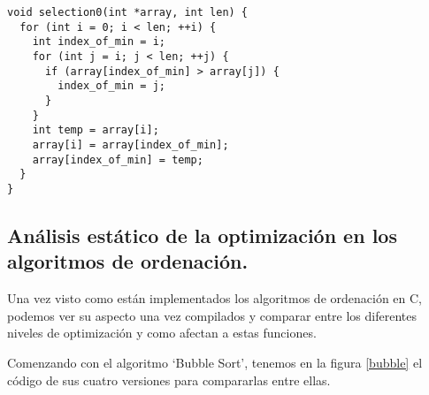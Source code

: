 \begin{lstlisting}[caption=Implementación de Selection Sort]
void selection0(int *array, int len) {
  for (int i = 0; i < len; ++i) {
    int index_of_min = i;
    for (int j = i; j < len; ++j) {
      if (array[index_of_min] > array[j]) {
        index_of_min = j;
      }
    }
    int temp = array[i];
    array[i] = array[index_of_min];
    array[index_of_min] = temp;
  }
}
\end{lstlisting}

\subsection{Análisis estático de la optimización en los algoritmos de ordenación.}
Una vez visto como están implementados los algoritmos de ordenación en C, podemos ver su aspecto una vez compilados y comparar entre los diferentes niveles de optimización y como afectan a estas funciones.

Comenzando con el algoritmo `Bubble Sort', tenemos en la figura \ref{bubble} el código de sus cuatro versiones para compararlas entre ellas.

